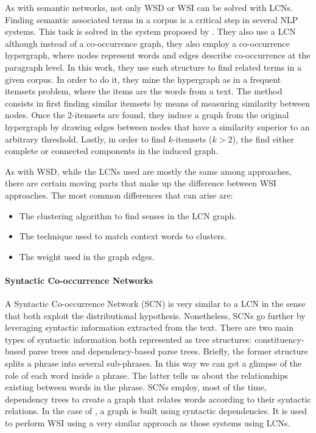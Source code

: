 As with semantic networks, not only WSD or WSI can be solved with LCNs. Finding semantic associated terms in a corpus is a critical step in several NLP systems. This task is solved in the system proposed by \cite{2011.Haishan.AHypergraphbased}. They also use a LCN although instead of a co-occurrence graph, they also employ a co-occurrence hypergraph, where nodes represent words and edges describe co-occurrence at the paragraph level.  In this work, they use such structure to find related terms in a given corpus. In order to do it, they mine the hypergraph as in a frequent itemsets problem, where the items are the words from a text. The method consists in first finding similar itemsets by means of measuring similarity between nodes. Once the 2-itemsets are found, they induce a graph from the original hypergraph by drawing edges between nodes that have a similarity superior to an arbitrary threshold. Lastly, in order to find $k$-itemsets ($k > 2$), the find either complete or connected components in the induced graph. 



As with WSD, while the LCNs used are mostly the same among approaches, there are certain moving parts that make up the difference between WSI approaches. The most common differences that can arise are:

\begin{itemize}
\item The clustering algorithm to find senses in the LCN graph.
\item The technique used to match context words to clusters.
\item The weight used in the graph edges.
\end{itemize}



\paragraph{Syntactic Co-occurrence Networks}
A Syntactic Co-occurrence Network (SCN) is very similar to a LCN  in the sense that both exploit the distributional hypothesis. Nonetheless, SCNs go further by leveraging  syntactic information extracted from the text. There are two main types of syntactic information both represented as tree structures: constituency-based parse trees and dependency-based parse trees. Briefly, the former structure splits a phrase into several sub-phrases. In this way we can get a glimpse of the role of each word inside a phrase. The latter tells us about the relationships existing between words in the phrase. SCNs employ, most of the time, dependency trees to create a graph that relates words according to their syntactic relations. In the case of \cite{2013.Hope.GradedWSI}, a graph is built using syntactic dependencies. It is used to perform WSI using a very similar approach as those systems using LCNs. 

